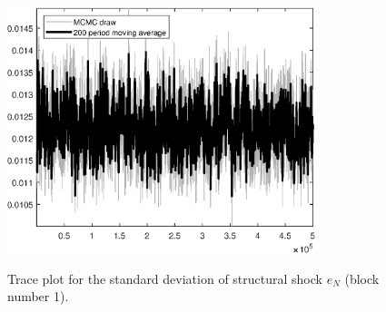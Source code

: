 \begin{figure}[H]
\centering
  \includegraphics[width=0.8\textwidth]{BRS_growth_ext_fd/graphs/TracePlot_SE_e_N_blck_1}\\
    \caption{Trace plot for the standard deviation of structural shock ${e_N}$ (block number 1).}
\end{figure}
